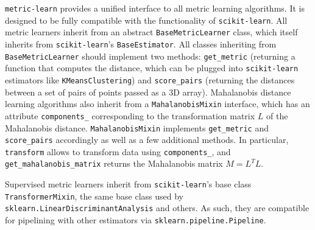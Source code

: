 \documentclass[twoside,11pt]{article}
\newcommand{\aurelien}[1]{\todo[inline,caption={},color=orange!40]{{\it Aurelien:~}#1}}
\begin{document}
\texttt{metric-learn} provides a unified interface to all metric learning algorithms. %
It is designed to be fully compatible with the functionality of \texttt{scikit-learn}.
All metric learners inherit from an abstract \texttt{BaseMetricLearner} class, which itself inherits from \texttt{scikit-learn}'s \texttt{BaseEstimator}. All classes inheriting from \texttt{BaseMetricLearner} should implement two methods: \texttt{get\_metric} (returning a function that computes the distance, which can be plugged into \texttt{scikit-learn} estimators like \texttt{KMeansClustering}) and \texttt{score\_pairs} (returning the distances between a set of pairs of points passed as a 3D array).
Mahalanobis distance learning algorithms also inherit from a \texttt{MahalanobisMixin} interface, which has an attribute \texttt{components\_} corresponding to the transformation matrix $L$ of the Mahalanobis distance. \texttt{MahalanobisMixin} implements \texttt{get\_metric} and \texttt{score\_pairs} accordingly as well as a few additional methods. In particular, \texttt{transform} allows to transform data using \texttt{components\_}, and \texttt{get\_mahalanobis\_matrix} returns the Mahalanobis matrix $M=L^TL$.

Supervised metric learners inherit from \texttt{scikit-learn}'s base class \texttt{TransformerMixin}, the same base class used by \texttt{sklearn.LinearDiscriminantAnalysis} and others.
As such, they are compatible for pipelining with other estimators via \texttt{sklearn.pipeline.Pipeline}.
\end{document}
